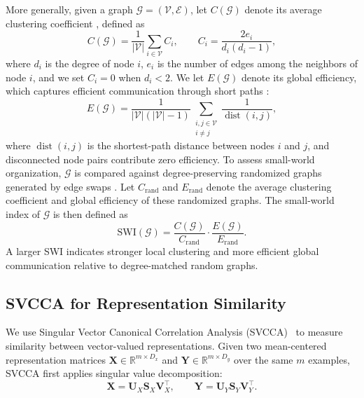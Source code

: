 More generally, given a graph $\mathcal{G}=(\mathcal{V},\mathcal{E})$, let $C(\mathcal{G})$ denote its average clustering coefficient \cite{watts1998collective}, defined as
\begin{equation}
C(\mathcal{G}) =
\frac{1}{|\mathcal{V}|}
\sum_{i\in\mathcal{V}} C_i,
\qquad
C_i =
\frac{2e_i}{d_i(d_i-1)},
\end{equation}
where $d_i$ is the degree of node $i$, $e_i$ is the number of edges among the neighbors of node $i$, and we set $C_i=0$ when $d_i<2$. We let $E(\mathcal{G})$ denote its global efficiency, which captures efficient communication through short paths \cite{latora2001efficient}:
\begin{equation}
E(\mathcal{G}) =
\frac{1}{|\mathcal{V}|(|\mathcal{V}|-1)}
\sum_{\substack{i,j\in\mathcal{V}\\ i\neq j}}
\frac{1}{\operatorname{dist}(i,j)},
\end{equation}
where $\operatorname{dist}(i,j)$ is the shortest-path distance between nodes $i$ and $j$, and disconnected node pairs contribute zero efficiency. To assess small-world organization, $\mathcal{G}$ is compared against degree-preserving randomized graphs generated by edge swaps \cite{hosseini2013influence}. Let $C_{\mathrm{rand}}$ and $E_{\mathrm{rand}}$ denote the average clustering coefficient and global efficiency of these randomized graphs. The small-world index of $\mathcal{G}$ is then defined as
\begin{equation}
\mathrm{SWI}(\mathcal{G}) =
\frac{C(\mathcal{G})}{C_{\mathrm{rand}}}
\cdot
\frac{E(\mathcal{G})}{E_{\mathrm{rand}}}.
\label{eq:swi}
\end{equation}
A larger SWI indicates stronger local clustering and more efficient global communication relative to degree-matched random graphs.


\subsection{SVCCA for Representation Similarity}
\label{sec:svcca_prelim}

We use Singular Vector Canonical Correlation Analysis (SVCCA)~\cite{raghu2017svcca} to measure similarity between vector-valued representations. Given two mean-centered representation matrices
$\mathbf{X}\in\mathbb{R}^{m\times D_x}$ and
$\mathbf{Y}\in\mathbb{R}^{m\times D_y}$ over the same $m$ examples, SVCCA first applies singular value decomposition:
\begin{equation}
\mathbf{X} = \mathbf{U}_X \mathbf{S}_X \mathbf{V}_X^\top,
\qquad
\mathbf{Y} = \mathbf{U}_Y \mathbf{S}_Y \mathbf{V}_Y^\top .
\end{equation}

